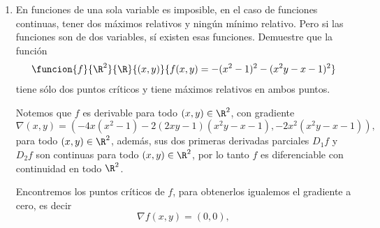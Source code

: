 \documentclass[a4,11pt]{aleph-examen}
\begin{document}
\begin{preguntas}
\begin{respuesta}
\begin{respuesta}
\begin{respuesta}
\begin{enumerate}
\begin{respuesta}
	Las derivadas parciales del campo escalar $C$ son
	\[
		D_1 C(x)=6x_1+2x_2-12\yds 
		D_2 C(x)=8x_2+2x_1-26
	\]
	para todo $x\in\R^2$. Ahora, para encontrar los puntos críticos del campo escalar debemos resolver el sistema
	\[
		\begin{cases}
		6x_1+2x_2=12\\
		8x_2+2x_1=26,
		\end{cases}
	\]
	que es equivalente a $\nabla C(x)=0$. La solución del sistema anterior es $x_1= 1$ y $x_2=3$. Para determinar si el punto crítico $(1,3)$ es un mínimo o un máximo debemos hallar la Hessiana. Así,
	\[
		H_f(x)=
			\begin{pmatrix}
				6&2\\
				2&8
			\end{pmatrix}
	\]
	para cada $x\in\R^2$. La matriz Hessiana es constante y 
	\[
		\det(H_f(x))=48-4=44>0.
	\]
	Como los dos menores de la matriz Hessiana son siempre positivos, por el criterio de Sylvester, se deduce que $f$ alcanza su mínimo en $(1,3)$ y este mínimo es
	\[
		f(1,3)=3+2(3)+4(9)-12-26(3)+50=5.
	\]
\end{respuesta}




\item 
    En funciones de una sola variable es imposible, en el caso de funciones continuas, tener dos máximos relativos y ningún mínimo relativo. Pero si las funciones son de dos variables, sí existen esas funciones. Demuestre que la función
    \[
    \funcion{f}{\R^2}{\R}
    {(x,y)}{f(x,y)=-(x^2-1)^2-(x^2y-x-1)^2}
	\]
    tiene sólo dos puntos críticos y tiene máximos relativos en ambos puntos.
    
\begin{respuesta}
    Notemos que $f$ es derivable para todo $(x, y)\in\R^2$, con gradiente 
    \[
    \nabla (x,y) = (-4x(x^2-1) - 2(2xy-1)(x^2y-x-1), -2x^2(x^2y-x-1)),
    \]
    para todo $(x, y)\in\R^2$, además, sus dos primeras derivadas parciales $D_1 f$ y $D_2 f$ son continuas para todo $(x, y)\in\R^2$, por lo tanto $f$ es diferenciable con continuidad en todo $\R^2$.
    
    Encontremos los puntos críticos de $f$, para obtenerlos igualemos el gradiente a cero, es decir
    \[
    \nabla f(x,y) = (0, 0),
    \]
    

\end{respuesta}
\end{enumerate}
\end{respuesta}
\end{respuesta}
\end{respuesta}
\end{preguntas}
\end{document}
